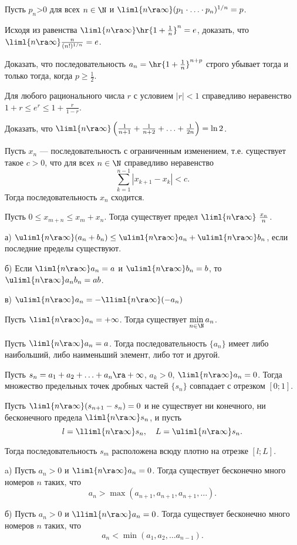\documentclass[a4paper]{article}
\newcommand{\lima}{\uliml{n\ra\infty}}
\newcommand{\limb}{\lliml{n\ra\infty}}
\begin{document}
\begin{nums}{-1}
\item Пусть $p_n$>0 для всех $n\in \N$ и
$\liml{n\ra\infty}(p_1\cdot\ldots\cdot
p_n)^{1/n}=p$.

\item Исходя из равенства
$\liml{n\ra\infty}\hr{1+\frac{1}{n}}^n=e$, доказать,
что $\liml{n\ra\infty}\frac{n}{(n!)^{1/n}}=e$.

\item Доказать, что последовательность
$a_n=\hr{1+\frac{1}{n}}^{n+p}$ строго убывает тогда и только тогда,
когда  $p\ge \frac{1}{2}$.

\item Для любого рационального числа $r$ с условием $|r|<1$
справедливо неравенство $1+r\le e^r\le 1+\frac{r}{1-r}$.

\item Доказать, что
$\liml{n\ra\infty}\left(\frac{1}{n+1}+\frac{1}{n+2}+\ldots
+\frac{1}{2n}\right) =\ln 2$.

\item Пусть $x_n$ --- последовательность с ограниченным изменением, т.е. существует такое $c>0$, что для всех $n\in
\N$ справедливо неравенство
$$\sum_{k=1}^{n-1}|x_{k+1}-x_{k}|<c.$$
Тогда последовательность $x_n$ сходится.

\item Пусть $0\le x_{m+n}\le x_m+x_n$. Тогда существует предел $\liml{n\ra\infty}\ \frac{x_n}{n}$.

\item а) $\lima(a_n+b_n)\leq \lima a_n+\lima b_n$, если последние пределы существуют.

б) Если $\liml{n\ra\infty}a_n=a$ и $\lima b_n=b$, то $\lima a_nb_n=ab$.

в) $\lima a_n=-\limb (-a_n)$

\item Пусть $\liml{n\ra\infty} a_n=+\infty$. Тогда существует $\min\limits_{n\in\N}a_n$.

\item Пусть $\liml{n\ra\infty} a_n=a$. Тогда последовательность $\{a_n\}$ имеет либо наибольший, либо
наименьший элемент, либо тот и другой.

\item Пусть $s_n=a_1+a_2+\ldots +a_n\ra+\infty$, $a_k>0$, $\liml{n\ra\infty} a_n=0$. Тогда множество
предельных точек дробных частей $\{s_n\}$ совпадает с отрезком
$[0; 1]$.

\item Пусть $\liml{n\ra\infty}
(s_{n+1}-s_n)=0$ и не существует ни конечного, ни бесконечного предела $\liml{n\ra\infty} s_n$, и пусть
$$l=\limb s_n, \quad L=\lima s_n.$$

Тогда последовательность $s_m$ расположена всюду плотно на отрезке $[l; L]$.

\item a) Пусть $a_n>0$ и $\liml{n\ra\infty}
a_n=0$. Тогда существует бесконечно много номеров $n$ таких, что
$$a_n >\max(a_{n+1}, a_{n+1}, a_{n+1}, \ldots ).$$

б) Пусть $a_n>0$ и $\limb a_n=0$. Тогда существует бесконечно много номеров $n$ таких, что
$$a_n<\min(a_{1}, a_{2}, \ldots a_{n-1}).$$
\end{nums}

\medskip
\dmvntrail
\end{document}
